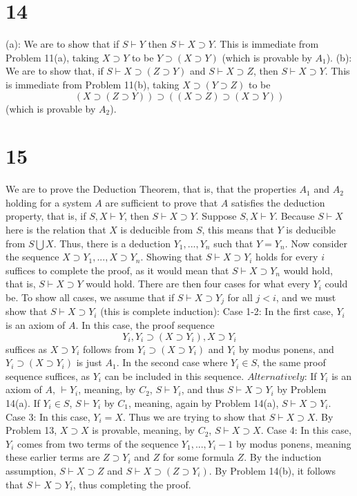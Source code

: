 \documentclass{article}
\theoremstyle{definition}
\begin{document}
\section*{14}
(a): We are to show that if $S\vdash Y$ then $S\vdash X\supset Y$. This is immediate from Problem 11(a), taking $X\supset Y$ to be 
$Y\supset (X\supset Y)$ (which is provable by $A_1$).\newline
(b): We are to show that, if $S\vdash X\supset (Z\supset Y)$ and $S\vdash X\supset Z$, then $S\vdash X\supset Y$. This is immediate from Problem 11(b), 
taking $X\supset (Y\supset Z)$ to be \[ (X\supset (Z\supset Y))\supset ((X\supset Z)\supset (X\supset Y)) \] (which is provable by $A_2$).

\section*{15}
We are to prove the Deduction Theorem, that is, that the properties $A_1$ and $A_2$ holding for a system $A$ are sufficient to prove that 
$A$ satisfies the deduction property, that is, if $S,X\vdash Y$, then $S\vdash X\supset Y$. Suppose $S,X\vdash Y$. Because $S\vdash X$ here is the 
relation that $X$ is deducible from $S$, this means that $Y$ is deducible from $S\bigcup {X}$. Thus, there is a deduction $Y_1,...,Y_n$ such that 
$Y=Y_n$. Now consider the sequence $X\supset Y_1,...,X\supset Y_n$. Showing that $S\vdash X\supset Y_i$ holds for every $i$ suffices to complete the 
proof, as it would mean that $S\vdash X\supset Y_n$ would hold, that is, $S\vdash X\supset Y$ would hold. There are then four cases for what every 
$Y_i$ could be. To show all cases, we assume that if $S\vdash X\supset Y_j$ for all $j<i$, and we must show that
$S\vdash X\supset Y_i$ (this is complete 
induction):\newline
Case 1-2: In the first case, $Y_i$ is an axiom of $A$. In this case, the proof sequence \[ Y_i,Y_i\supset (X\supset Y_i),X\supset Y_i \] 
suffices as $X\supset Y_i$ follows from $Y_i\supset (X\supset Y_i)$ and $Y_i$ by modus ponens, and $Y_i\supset (X\supset Y_i)$ is just $A_1$. In 
the second case where $Y_i\in S$, the same proof sequence suffices, as $Y_i$ can be included in this sequence.\newline
$Alternatively$: If $Y_i$ is an axiom of $A$, $\vdash Y_i$, meaning, by $C_2$, $S\vdash Y_i$, and thus $S\vdash X\supset Y_i$ by Problem 14(a). 
If $Y_i\in S$, $S\vdash Y_i$ by $C_1$, meaning, again by Problem 14(a), $S\vdash X\supset Y_i$.\newline
Case 3: In this case, $Y_i=X$. Thus we are trying to show that $S\vdash X\supset X$. By Problem 13, $X\supset X$ is provable, meaning, by $C_2$, 
$S\vdash X\supset X$.\newline
Case 4: In this case, $Y_i$ comes from two terms of the sequence $Y_1,...,Y_i-1$ by modus ponens, meaning these earlier terms are $Z\supset Y_i$ 
and $Z$ for some formula $Z$. By the induction 
assumption, $S\vdash X\supset Z$ and $S\vdash X\supset (Z\supset Y_i)$. By Problem 14(b), it follows that $S\vdash X\supset Y_i$, thus completing 
the proof.
\end{document}

